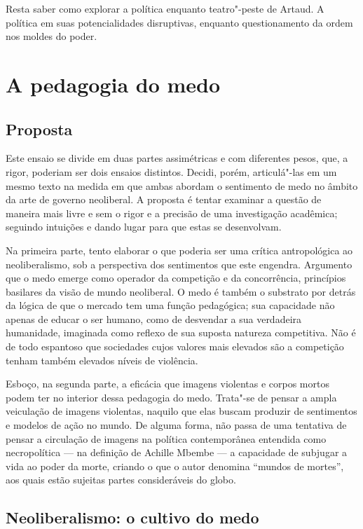 Resta saber como explorar a política enquanto teatro"-peste de Artaud. A
política em suas potencialidades disruptivas, enquanto questionamento da
ordem nos moldes do poder.

\chapter{A pedagogia do medo}

\section{Proposta}

Este ensaio se divide em duas partes assimétricas e com diferentes
pesos, que, a rigor, poderiam ser dois ensaios distintos. Decidi, porém,
articulá"-las em um mesmo texto na medida em que ambas abordam o
sentimento de medo no âmbito da arte de governo neoliberal. A proposta é
tentar examinar a questão de maneira mais livre e sem o rigor e a
precisão de uma investigação acadêmica; seguindo intuições e dando lugar
para que estas se desenvolvam.

Na primeira parte, tento elaborar o que poderia ser uma crítica
antropológica ao neoliberalismo, sob a perspectiva dos sentimentos que
este engendra. Argumento que o medo emerge como operador da competição e
da concorrência, princípios basilares da visão de mundo neoliberal. O
medo é também o substrato por detrás da lógica de que o mercado tem uma
função pedagógica; sua capacidade não apenas de educar o ser humano,
como de desvendar a sua verdadeira humanidade, imaginada como reflexo de
sua suposta natureza competitiva. Não é de todo espantoso que sociedades
cujos valores mais elevados são a competição tenham também elevados
níveis de violência.

Esboço, na segunda parte, a eficácia que imagens violentas e corpos
mortos podem ter no interior dessa pedagogia do medo. Trata"-se de pensar
a ampla veiculação de imagens violentas, naquilo que elas buscam
produzir de sentimentos e modelos de ação no mundo. De alguma forma, não
passa de uma tentativa de pensar a circulação de imagens na política
contemporânea entendida como necropolítica --- na definição de Achille Mbembe --- a capacidade de subjugar a vida ao poder da morte, criando o
que o autor denomina ``mundos de mortes'', aos quais estão sujeitas partes
consideráveis do globo.

\section{Neoliberalismo: o cultivo do medo}

